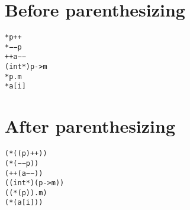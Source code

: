 \documentclass{article}
\begin{document}
 \section*{Before parenthesizing}
      \texttt{*p++}\\
      \texttt{*−−p}\\
      \texttt{++a−−}\\
      \texttt{(int*)p->m}\\
      \texttt{*p.m}\\
      \texttt{*a[i]}\\
      
\section*{After parenthesizing}
      \texttt{(*((p)++))}\\
      \texttt{(*(−−p))}\\
      \texttt{(++(a−−))}\\
      \texttt{((int*)(p->m))}\\
      \texttt{((*(p)).m)}\\
      \texttt{(*(a[i]))}\\
\end{document}
